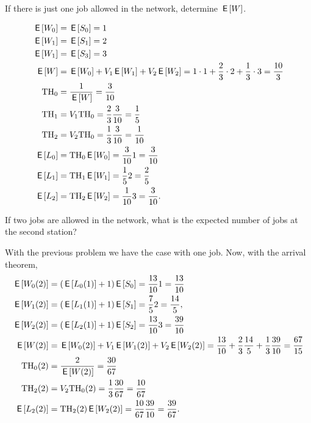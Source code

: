 \begin{exercise}[201807]
 If there is just one job allowed in the network, determine $\E W$.
\begin{solution}
 \begin{align*}
 \E{W_0} &= \E{S_0} = 1\\ 
 \E{W_1} &= \E{S_1} = 2\\
 \E{W_1} &= \E{S_3} = 3\\
\E W &= \E{W_0} + V_1 \E{W_1} + V_2 \E{W_2} = 1\cdot 1 + \frac{2}{3}\cdot 2 + \frac{1}{3} \cdot 3 = \frac{10}{3}\\
\TH_0 &= \frac{1}{\E W} = \frac{3}{10}\\
\TH_1&= V_1 \TH_0 = \frac{2}{3} \frac{3}{10}=\frac{1}{5}\\
\TH_2&= V_2 \TH_0 = \frac{1}{3} \frac{3}{10}=\frac{1}{10}\\
\E{L_0} &= \TH_0 \E{W_0} = \frac{3}{10} 1 = \frac{3}{10}\\
\E{L_1} &= \TH_1 \E{W_1} = \frac{1}{5} 2 = \frac{2}{5}\\
\E{L_2} &= \TH_2 \E{W_2} = \frac{1}{10} 3 = \frac{3}{10}.
 \end{align*}
\end{solution}

\end{exercise}

\begin{exercise}[201807]
If two jobs are allowed in the network, what is the expected number of jobs at the second station?
\begin{solution}
 With the previous problem we have the case with one job. Now, with the arrival theorem,
 \begin{align*}
\E{W_{0}(2)} &= (\E{L_0(1)} + 1)\E{S_0} = \frac{13}{10} 1 = \frac{13}{10} \\
\E{W_{1}(2)} &= (\E{L_1(1)} + 1)\E{S_1} = \frac{7}{5} 2 = \frac{14}{5}, \\
\E{W_{2}(2)} &= (\E{L_2(1)} + 1)\E{S_2} = \frac{13}{10} 3 = \frac{39}{10} \\
\E{W(2)} &= \E{W_0(2)} + V_1 \E{W_1(2)} + V_2 \E{W_2(2)} = \frac{13}{10}+ \frac{2}{3}\frac{14}{5} + \frac{1}{3}\frac{39}{10}=\frac{67}{15}\\
\TH_0(2) &= \frac{2}{\E{W(2)}} = \frac{30}{67}\\
\TH_2(2) &= V_2 \TH_0(2) = \frac{1}{3} \frac{30}{67}=\frac{10}{67}\\
\E{L_2(2)} &= \TH_2(2) \E{W_2(2)} = \frac{10}{67} \frac{39}{10} = \frac{39}{67}.
 \end{align*}

\end{solution}
\end{exercise}


